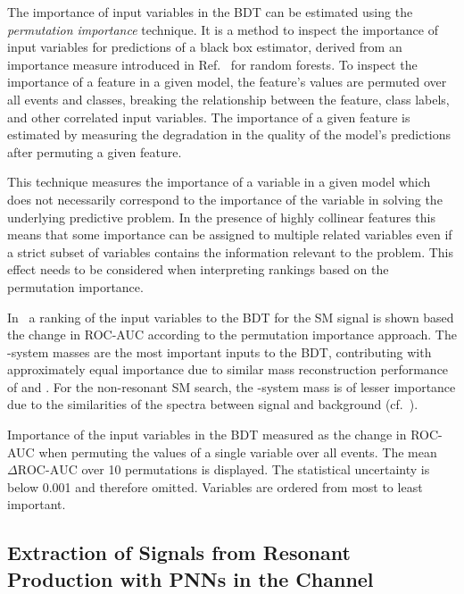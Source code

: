The importance of input variables in the BDT can be estimated using
the \emph{permutation importance} technique. It is a method to inspect
the importance of input variables for predictions of a black box
estimator, derived from an importance measure introduced in
Ref.~\cite{breiman01} for random forests. To inspect the importance of
a feature in a given model, the feature's values are permuted over all
events and classes, breaking the relationship between the feature,
class labels, and other correlated input variables. The importance of
a given feature is estimated by measuring the degradation in the
quality of the model's predictions after permuting a given feature.

This technique measures the importance of a variable in a given model
which does not necessarily correspond to the importance of the
variable in solving the underlying predictive problem. In the presence
of highly collinear features this means that some importance can be
assigned to multiple related variables even if a strict subset of
variables contains the information relevant to the problem. This
effect needs to be considered when interpreting rankings based on the
permutation importance.

In~ a ranking of the input variables
to the BDT for the SM \HH signal is shown based the change in ROC-AUC
according to the permutation importance approach. The \PHiggs-system
masses are the most important inputs to the BDT, contributing with
approximately equal importance due to similar mass reconstruction
performance of \mMMC and \mBB. For the non-resonant SM \HH search, the
\HH-system mass is of lesser importance due to the similarities of the
\mHH spectra between signal and background
(cf.~).

\begin{table}[htbp]
  \centering

  \caption{Importance of the input variables in the BDT measured as
    the change in ROC-AUC when permuting the values of a single
    variable over all events. The mean $\Delta\text{ROC-AUC}$ over 10
    permutations is displayed. The statistical uncertainty is below
    0.001 and therefore omitted. Variables are ordered from most to
    least important.}%
  \label{tab:variable_importance_bdt}

  
\end{table}


\subsection{Extraction of Signals from Resonant \HH Production with
  PNNs in the \hadhad Channel}%
\label{sec:mva_pnn}

